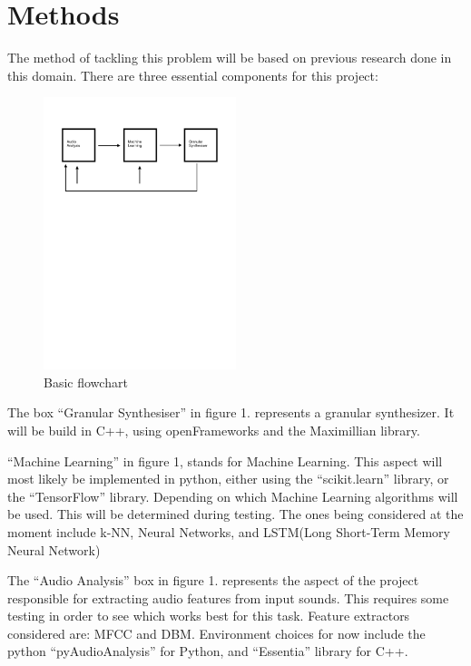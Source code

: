 \chapter{Methods}
\label{chapterlabel3}

The method of tackling this problem will be based on previous research done in this domain. There are three essential components for this project:
\begin{figure}[h]
\caption{Basic flowchart}
\centering
\includegraphics[width=0.5\textwidth]{images/flowchart}
\end{figure}

The box ``Granular Synthesiser'' in figure 1. represents a granular synthesizer.
It will be build in C++, using openFrameworks and the Maximillian
library.

``Machine Learning'' in figure 1, stands for Machine Learning. This aspect will
most likely be implemented in python, either using the
``scikit.learn''
library, or the
``TensorFlow''
library. Depending on which
Machine Learning algorithms will be used. This will be determined during
testing. The ones being considered at the moment include k-NN, Neural Networks,
and LSTM(Long Short-Term Memory Neural Network)

The ``Audio Analysis'' box in figure 1. represents the aspect of the project responsible for extracting audio features from input sounds. This requires some testing in order to see which works best for this task. Feature extractors considered are: MFCC and DBM. Environment choices for now include the python ``pyAudioAnalysis'' for Python, and ``Essentia'' library for C++.


